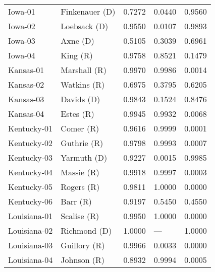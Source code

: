 \begin{longtable}{llrll}
           Iowa-01 &       {\color{Blue} Finkenauer (D)} &       0.7272 &        0.0440 &        0.9560 \\
           Iowa-02 &         {\color{Blue} Loebsack (D)} &       0.9550 &        0.0107 &        0.9893 \\
           Iowa-03 &             {\color{Blue} Axne (D)} &       0.5105 &        0.3039 &        0.6961 \\
           Iowa-04 &              {\color{Red} King (R)} &       0.9758 &        0.8521 &        0.1479 \\
         Kansas-01 &          {\color{Red} Marshall (R)} &       0.9970 &        0.9986 &        0.0014 \\
         Kansas-02 &           {\color{Red} Watkins (R)} &       0.6975 &        0.3795 &        0.6205 \\
         Kansas-03 &           {\color{Blue} Davids (D)} &       0.9843 &        0.1524 &        0.8476 \\
         Kansas-04 &             {\color{Red} Estes (R)} &       0.9945 &        0.9932 &        0.0068 \\
       Kentucky-01 &             {\color{Red} Comer (R)} &       0.9616 &        0.9999 &        0.0001 \\
       Kentucky-02 &           {\color{Red} Guthrie (R)} &       0.9798 &        0.9993 &        0.0007 \\
       Kentucky-03 &          {\color{Blue} Yarmuth (D)} &       0.9227 &        0.0015 &        0.9985 \\
       Kentucky-04 &            {\color{Red} Massie (R)} &       0.9918 &        0.9997 &        0.0003 \\
       Kentucky-05 &            {\color{Red} Rogers (R)} &       0.9811 &        1.0000 &        0.0000 \\
       Kentucky-06 &              {\color{Red} Barr (R)} &       0.9197 &        0.5450 &        0.4550 \\
      Louisiana-01 &           {\color{Red} Scalise (R)} &       0.9950 &        1.0000 &        0.0000 \\
      Louisiana-02 &         {\color{Blue} Richmond (D)} &       1.0000 &           --- &        1.0000 \\
      Louisiana-03 &          {\color{Red} Guillory (R)} &       0.9966 &        0.0033 &        0.0000 \\
      Louisiana-04 &           {\color{Red} Johnson (R)} &       0.8932 &        0.9994 &        0.0005 \\

\end{longtable}
